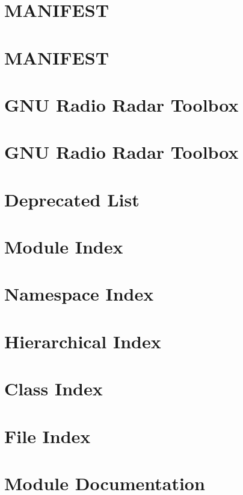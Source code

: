 \documentclass[twoside]{article}
\newcommand{\+}{\discretionary{\mbox{\scriptsize$\hookleftarrow$}}{}{}}
\begin{document}
\section{M\+A\+N\+I\+F\+E\+ST}
\label{md__home_erik_prefix_default_src_gr-radar-dev_MANIFEST}

\section{M\+A\+N\+I\+F\+E\+ST}
\label{md__home_erik_prefix_default_src_gr-radar-dev_OLD_MANIFEST}

\section{G\+NU Radio Radar Toolbox}
\label{md__home_erik_prefix_default_src_gr-radar-dev_OLD_README}

\section{G\+NU Radio Radar Toolbox}
\label{md__home_erik_prefix_default_src_gr-radar-dev_README}

\section{Deprecated List}
\label{deprecated}

\section{Module Index}

\section{Namespace Index}

\section{Hierarchical Index}

\section{Class Index}

\section{File Index}

\section{Module Documentation}









\end{document}
